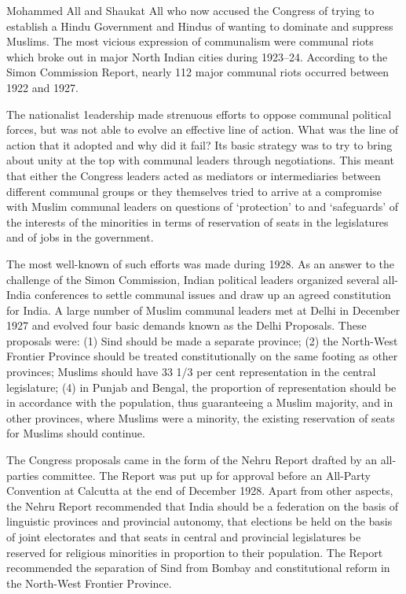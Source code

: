 \begin{multicols}{2}
Mohammed All and Shaukat All who now accused the Congress of trying to establish a Hindu Government and Hindus of wanting to dominate and suppress Muslims. The most vicious expression of communalism were communal riots which broke out in major North Indian cities during 1923--24. According to the Simon Commission Report, nearly 112 major communal riots occurred between 1922 and 1927. 

The nationalist 1eadership made strenuous efforts to oppose communal political forces, but was not able to evolve an effective line of action. What was the line of action that it adopted and why did it fail? Its basic strategy was to try to bring about unity at the top with communal leaders through negotiations. This meant that either the Congress leaders acted as mediators or intermediaries between different communal groups or they themselves tried to arrive at a compromise with Muslim communal leaders on questions of `protection' to and `safeguards' of the interests of the minorities in terms of reservation of seats in the legislatures and of jobs in the government. 

The most well-known of such efforts was made during 1928. As an answer to the challenge of the Simon Commission, Indian political leaders organized several all-India conferences to settle communal issues and draw up an agreed constitution for India. A large number of Muslim communal leaders met at Delhi in December 1927 and evolved four basic demands known as the Delhi Proposals. These proposals were: (1) Sind should be made a separate province; (2) the North-West Frontier Province should be treated constitutionally on the same footing as other provinces; Muslims should have 33 1/3 per cent representation in the central legislature; (4) in Punjab and Bengal, the proportion of representation should be in accordance with the population, thus guaranteeing a Muslim majority, and in other provinces, where Muslims were a minority, the existing reservation of seats for Muslims should continue. 

The Congress proposals came in the form of the Nehru Report drafted by an all-parties committee. The Report was put up for approval before an All-Party Convention at Calcutta at the end of December 1928. Apart from other aspects, the Nehru Report recommended that India should be a federation on the basis of linguistic provinces and provincial autonomy, that elections be held on the basis of joint electorates and that seats in central and provincial legislatures be reserved for religious minorities in proportion to their population. The Report recommended the separation of Sind from Bombay and constitutional reform in the North-West Frontier Province. 


\end{multicols}
